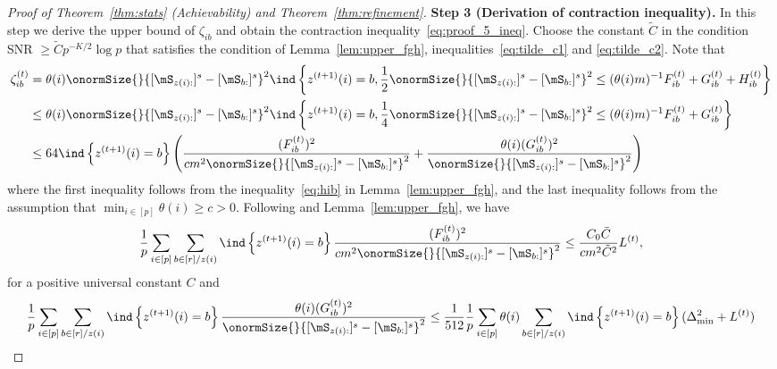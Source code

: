 \documentclass[lettersize,onecolumn,journal]{IEEEtran}
\theoremstyle{definition}
\theoremstyle{definition}
\newcommand{\of}[1]{\left(#1\right)}
\newcommand{\offf}[1]{\left\{#1\right\}}
\begin{document}
\begin{proof}[Proof of Theorem~\ref{thm:stats} (Achievability) and Theorem~\ref{thm:refinement}]
    {\bf Step 3 (Derivation of contraction inequality).} In this step we derive the upper bound of $\zeta_{ib}$ and obtain the contraction inequality~\eqref{eq:proof_5_ineq}. Choose the constant $\tilde C$ in the condition SNR $\geq \tilde C p^{-K/2} \log p$ that satisfies the condition of Lemma~\ref{lem:upper_fgh}, inequalities~\eqref{eq:tilde_c1} and \eqref{eq:tilde_c2}. Note that 
    \begin{align}
        \zeta_{ib}^{(t)} &= \theta(i) \onormSize{}{ [ \mS_{ z(i):}  ]^s - [ \mS_{b:}  ]^s  }^2 \ind \offf{z^{(t+1)}(i) = b, \frac{1}{2}\onormSize{}{ [ \mS_{z(i):}  ]^s - [ \mS_{b:}  ]^s  }^2 \leq (\theta(i) m)^{-1} F_{ib}^{(t)} + G_{ib}^{(t)} + H_{ib}^{(t)} }\\
        & \leq \theta(i) \onormSize{}{ [ \mS_{ z(i):}  ]^s - [ \mS_{b:}  ]^s  }^2 \ind \offf{z^{(t+1)}(i) = b, \frac{1}{4}\onormSize{}{ [ \mS_{z(i):}  ]^s - [ \mS_{b:}  ]^s  }^2 \leq (\theta(i) m)^{-1} F_{ib}^{(t)} + G_{ib}^{(t)} } \\
        & \leq 64 \ind \offf{ z^{(t+1)}(i) = b} \of{  \frac{(F_{ib}^{(t)})^2}{ cm^2\onormSize{}{ [ \mS_{z(i):}  ]^s - [ \mS_{b:}  ]^s  }^2} + \frac{\theta(i)(G_{ib}^{(t)})^2}{ \onormSize{}{ [ \mS_{z(i):}  ]^s - [ \mS_{b:}  ]^s  }^2}    }
    \end{align}
    where the first inequality follows from the inequality~\eqref{eq:hib} in Lemma~\ref{lem:upper_fgh}, and the last inequality follows from the assumption that $\min_{i \in [p]} \theta(i) \geq c>0$. Following \citet[Step 4, Proof of Theorem 2]{han2020exact} and Lemma~\ref{lem:upper_fgh}, we have 
    \begin{align}\label{eq:f_sum}
          \frac{1}{p} \sum_{i \in [p]}\sum_{b \in [r]/z(i)} \ind \offf{ z^{(t+1)}(i) = b} \frac{(F_{ib}^{(t)})^2}{ cm^2 \onormSize{}{ [ \mS_{z(i):}  ]^s - [ \mS_{b:}  ]^s  }^2} \leq \frac{C_0 \bar C}{c m^2 \tilde C^2} L^{(t)},
    \end{align}
   for a positive universal constant $C$ and 
    \begin{align}
         \frac{1}{p} \sum_{i \in [p]}\sum_{b \in [r]/z(i)} \ind \offf{ z^{(t+1)}(i) = b} \frac{\theta(i)(G_{ib}^{(t)})^2}{ \onormSize{}{ [ \mS_{z(i):}  ]^s - [ \mS_{b:}  ]^s  }^2}  &\leq \frac{1}{512} \frac{1}{p} \sum_{i \in [p]}\theta(i) \sum_{b \in [r]/z(i)}   \ind \offf{ z^{(t+1)}(i) = b}  (\Delta_{\min}^2 + L^{(t)}) \\

\end{align}
\end{proof}
\end{document}
